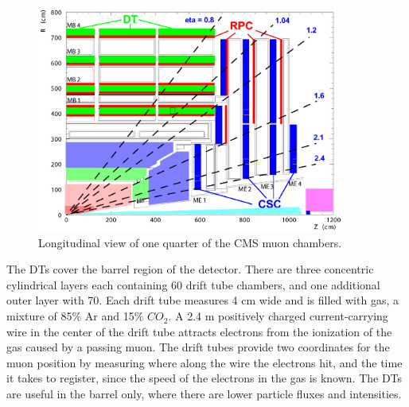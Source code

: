 \begin{figure}[hbtp]
 \begin{center}
   \includegraphics[width=0.9\textwidth]{cms_muonchamber.pdf}
   \caption[text in square brackets]{Longitudinal view of one quarter of the CMS muon chambers.}
   \label{fig:cms_muonchamber}
 \end{center}
\end{figure}

The DTs cover the barrel region of the detector. There are three concentric cylindrical layers each containing 60 drift tube chambers, and one additional outer layer with 70.
Each drift tube measures 4 cm wide and is filled with gas, a mixture of 85$\%$ Ar and 15$\%$ $CO_{2}$. A 2.4 m positively charged current-carrying wire in the center of the drift tube attracts electrons from the ionization of the gas caused by a passing muon. The drift tubes provide two coordinates for the muon position by measuring where along the wire the
electrons hit, and the time it takes to register, since the speed of the electrons in the gas is known. The DTs are useful in the barrel only, where there are lower particle fluxes
and intensities. 

